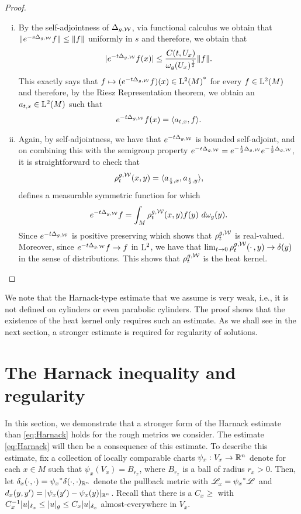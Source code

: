 \documentclass[a4paper, 12pt]{amsart}
\begin{document}
\begin{proof}
\begin{enumerate}[(i)]
\item By the self-adjointness of $\Delta_{g,\mathcal{W}}$, via functional calculus 
	we obtain that $\| e^{-s\Delta_{g,\mathcal{W}}}f \| \leq \| f \|$
	uniformly in $s$  and therefore, we obtain that
	$$|e^{-t \Delta_{g,\mathcal{W}}}f(x)| \leq 
		\frac{C(t,U_x)}{\omega_g(U_x)^{\frac{1}{2}}} \| f \|.$$
	This exactly says that $f \mapsto (e^{-t\Delta_{g,\mathcal{W}}}f)(x) \in {{\rm L}^{2}_{\rm {}}(M)}^\ast$
	for every $f \in {\rm L}^{2}_{\rm {}}(M)$ and therefore, by the Riesz Representation theorem,
	we obtain an $a_{t,x} \in {\rm L}^{2}_{\rm {}}(M)$ such that
	$$ e^{-t \Delta_{g,\mathcal{W}}}f(x) = \langle a_{t,x},f \rangle.$$

\item Again, by self-adjointness, we have that $e^{-t \Delta_{g,\mathcal{W}}}$
	is bounded self-adjoint, and
	on combining this with the semigroup property 
	$e^{-t\Delta_{g,\mathcal{W}}} = e^{-\frac{t}{2} \Delta_{g,\mathcal{W}}}e^{-\frac{t}{2} \Delta_{g,\mathcal{W}}}$, 
	it is straightforward to check that 
		$$\rho^{g,\mathcal{W}}_t(x,y) = \langle a_{\frac{t}{2}, x}, a_{\frac{t}{2}, y} \rangle,$$
	defines a measurable symmetric function for which 
	$$e^{-t \Delta_{g,\mathcal{W}}}f = \int_{M} \rho^{g,\mathcal{W}}_t(x,y)f(y)\ d\omega_g(y).$$
	Since $e^{-t \Delta_{g,\mathcal{W}}}$
	is positive preserving which shows that $\rho_t^{g,\mathcal{W}}$
	is real-valued. Moreover, since $e^{-t\Delta_{g,\mathcal{W}}}f \to f$
	in ${\rm L}^{2}_{\rm {}}$, we have that 
	$\lim_{t \to 0} \rho^{g,\mathcal{W}}_t(\cdotp,y) \to  \delta(y)$
	in the sense of distributions. This
	shows that $\rho^{g,\mathcal{W}}_t$ is the heat kernel.
\end{enumerate} 
\end{proof}

\begin{rem}
We note that the Harnack-type estimate that we assume is very 
weak, i.e., it is not defined on cylinders or even 
parabolic cylinders. The proof shows that the existence 
of the heat kernel only requires such an estimate. 
As we shall see in the next section, a stronger
estimate is required for regularity of solutions. 
\end{rem}

\section{The Harnack inequality and regularity}
\label{sec:harnack}


In this section, we demonstrate that a
 stronger form of the  Harnack 
estimate than \eqref{eq:Harnack} holds for the rough 
metrics we consider. The estimate \eqref{eq:Harnack} 
will then be a consequence of this estimate.
To describe this estimate, fix a collection of 
locally comparable charts $\psi_x:V_x \to \mathbb{R}^n$ denote
for each $x \in M$ such that $\psi_x(V_x) = B_{r_x}$,
where $B_{r_x}$ is a ball of radius $r_x > 0$. 
Then, let
$\delta_x(\cdot, \cdot) = {\psi_x}^\ast\delta(\cdot, \cdot)_{\mathbb{R}^n}$
denote the pullback metric with $\mathscr{L}^{{}}_x = {\psi_x}^\ast\mathscr{L}^{{}}$
and $d_x(y,y') = |\psi_x(y') - \psi_x(y)|_{\mathbb{R}^n}$.
Recall that there is a $C_x \geq $
with $C_x^{-1}  |u|_{\delta_x} \leq |u|_g \leq C_x |u|_{\delta_x}$
almost-everywhere in $V_x$.
\end{document}
